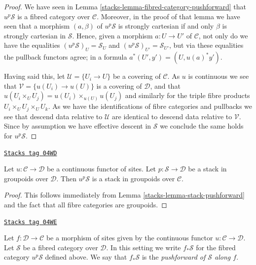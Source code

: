 \begin{proof}

We have seen in
Lemma \ref{stacks-lemma-fibred-category-pushforward}
that $u^p\mathcal{S}$ is a fibred category over $\mathcal{C}$.
Moreover, in the proof of that lemma we have seen that a morphism
$(a, \beta)$ of $u^p\mathcal{S}$ is strongly cartesian if and
only $\beta$ is strongly cartesian in $\mathcal{S}$. Hence,
given a morphism $a : U \to U'$ of $\mathcal{C}$, not only
do we have the equalities
$(u^p\mathcal{S})_U = \mathcal{S}_U$ and
$(u^p\mathcal{S})_{U'} = \mathcal{S}_{U'}$, but via these
equalities the pullback functors agree; in a formula
$a^*(U', y') = (U, u(a)^*y')$.

\medskip\noindent
Having said this, let $\mathcal{U} = \{U_i \to U\}$ be a covering
of $\mathcal{C}$. As $u$ is continuous we see that
$\mathcal{V} = \{u(U_i) \to u(U)\}$ is a covering of $\mathcal{D}$,
and that $u(U_i \times_U U_j) = u(U_i) \times_{u(U)} u(U_j)$ and
similarly for the triple fibre products $U_i \times_U U_j \times_U U_k$.
As we have the identifications of fibre categories and pullbacks
we see that descend data relative to $\mathcal{U}$ are identical
to descend data relative to $\mathcal{V}$. Since by assumption we have
effective descent in $\mathcal{S}$ we conclude the same holds for
$u^p\mathcal{S}$.
\end{proof}

\begin{lemma}
\label{stacks-lemma-stack-in-groupoids-pushforward}
\href{https://stacks.math.columbia.edu/tag/04WD}{\texttt{Stacks tag 04WD}}

Let $u : \mathcal{C} \to \mathcal{D}$ be a continuous functor of sites.
Let $p : \mathcal{S} \to \mathcal{D}$ be a stack in groupoids
over $\mathcal{D}$. Then $u^p\mathcal{S}$ is a stack in groupoids
over $\mathcal{C}$.
\end{lemma}

\begin{proof}

This follows immediately from
Lemma \ref{stacks-lemma-stack-pushforward}
and the fact that all fibre categories are groupoids.
\end{proof}

\begin{definition}
\label{stacks-definition-pushforward-stack}
\href{https://stacks.math.columbia.edu/tag/04WE}{\texttt{Stacks tag 04WE}}

Let $f : \mathcal{D} \to \mathcal{C}$ be a morphism of sites
given by the continuous functor $u : \mathcal{C} \to \mathcal{D}$.
Let $\mathcal{S}$ be a fibred category over $\mathcal{D}$.
In this setting we write {\it $f_*\mathcal{S}$} for the fibred
category $u^p\mathcal{S}$ defined above. We say that
$f_*\mathcal{S}$ is the {\it pushforward of $\mathcal{S}$ along $f$}.
\end{definition}

